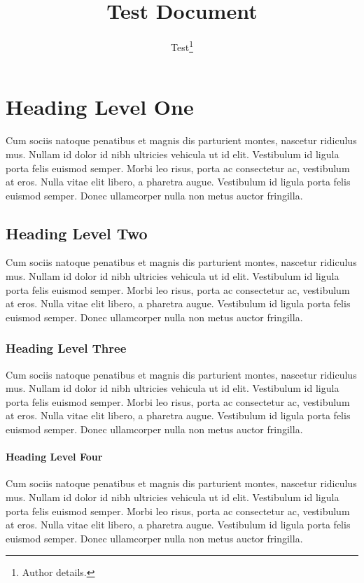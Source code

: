 \documentclass[a4paper,12pt]{article}
\begin{document}
\title{Test Document}
\author{Test\footnote{Author details.}}
\maketitle

\section{Heading Level One}

Cum sociis natoque penatibus et magnis dis parturient montes, nascetur ridiculus mus. Nullam id dolor id nibh ultricies vehicula ut id elit. Vestibulum id ligula porta felis euismod semper. Morbi leo risus, porta ac consectetur ac, vestibulum at eros. Nulla vitae elit libero, a pharetra augue. Vestibulum id ligula porta felis euismod semper. Donec ullamcorper nulla non metus auctor fringilla.

\subsection{Heading Level Two}

Cum sociis natoque penatibus et magnis dis parturient montes, nascetur ridiculus mus. Nullam id dolor id nibh ultricies vehicula ut id elit. Vestibulum id ligula porta felis euismod semper. Morbi leo risus, porta ac consectetur ac, vestibulum at eros. Nulla vitae elit libero, a pharetra augue. Vestibulum id ligula porta felis euismod semper. Donec ullamcorper nulla non metus auctor fringilla.

\subsubsection{Heading Level Three}

Cum sociis natoque penatibus et magnis dis parturient montes, nascetur ridiculus mus. Nullam id dolor id nibh ultricies vehicula ut id elit. Vestibulum id ligula porta felis euismod semper. Morbi leo risus, porta ac consectetur ac, vestibulum at eros. Nulla vitae elit libero, a pharetra augue. Vestibulum id ligula porta felis euismod semper. Donec ullamcorper nulla non metus auctor fringilla.

\paragraph{Heading Level Four}

Cum sociis natoque penatibus et magnis dis parturient montes, nascetur ridiculus mus. Nullam id dolor id nibh ultricies vehicula ut id elit. Vestibulum id ligula porta felis euismod semper. Morbi leo risus, porta ac consectetur ac, vestibulum at eros. Nulla vitae elit libero, a pharetra augue. Vestibulum id ligula porta felis euismod semper. Donec ullamcorper nulla non metus auctor fringilla.
\end{document}
